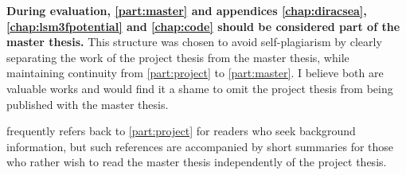 \textbf{During evaluation, \cref{part:master} and appendices \ref{chap:diracsea}, \ref{chap:lsm3fpotential} and \ref{chap:code} should be considered part of the master thesis.}
This structure was chosen to avoid self-plagiarism by clearly separating the work of the project thesis from the master thesis,
while maintaining continuity from \cref{part:project} to \cref{part:master}.
I believe both are valuable works and would find it a shame to omit the project thesis from being published with the master thesis.

 frequently refers back to \cref{part:project} for readers who seek background information,
but such references are accompanied by short summaries for those who rather wish to read the master thesis independently of the project thesis.

\mbox{}\vfill
\begin{center}
\end{center}
